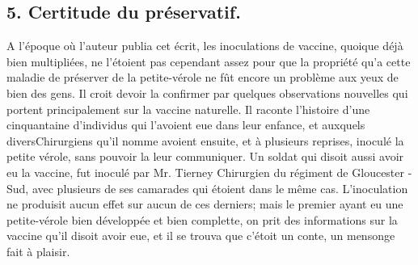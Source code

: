 \subsection{5. Certitude du préservatif.}
A l'époque où l'auteur publia cet écrit, les inoculations de vaccine, quoique déjà bien multipliées, ne l'étoient pas cependant assez pour que la propriété qu'a cette maladie de préserver de la petite-vérole ne fût encore un problème aux yeux de bien des gens. Il croit devoir la confirmer par quelques observations nouvelles qui portent principalement\setcounter{page}{286} sur la vaccine naturelle. Il raconte l'histoire d'une cinquantaine d'individus qui l'avoient eue dans leur enfance, et auxquels diversChirurgiens qu'il nomme avoient ensuite, et à plusieurs reprises, inoculé la petite vérole, sans pouvoir la leur communiquer. Un soldat qui disoit aussi avoir eu la vaccine, fut inoculé par Mr. Tierney Chirurgien du régiment de Gloucester - Sud, avec plusieurs de ses camarades qui étoient dans le même cas. L'inoculation ne produisit aucun effet sur aucun de ces derniers; mais le premier ayant eu une petite-vérole bien développée et bien complette, on prit des informations sur la vaccine qu'il disoit avoir eue, et il se trouva que c'étoit un conte, un mensonge fait à plaisir.
